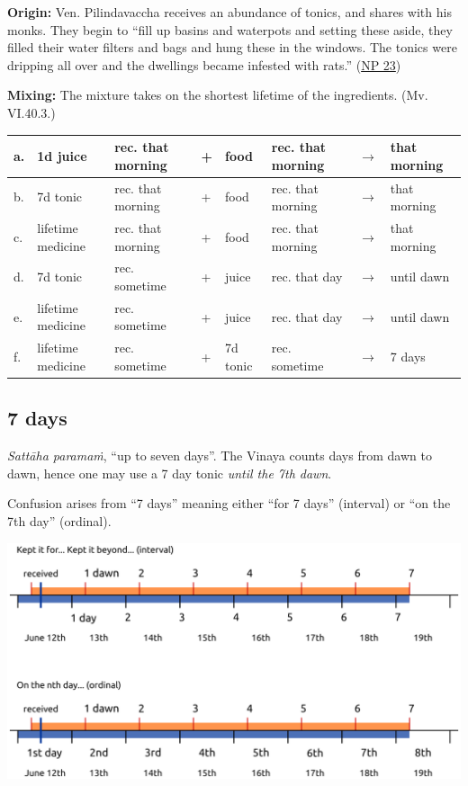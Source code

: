\clearpage

\textbf{Origin:} Ven. Pilindavaccha receives an abundance of tonics, and
shares with his monks. They begin to ``fill up basins and waterpots and
setting these aside, they filled their water filters and bags and hung
these in the windows. The tonics were dripping all over and the
dwellings became infested with rats.''
(\href{https://suttacentral.net/pli-tv-bu-vb-np23/en/brahmali}{NP 23})

\textbf{Mixing:} The mixture takes on the shortest lifetime of the
ingredients. (Mv. VI.40.3.)

\begin{center}
\begin{tabular}{llllllll}
a. & 1d juice & rec. that morning & + & food & rec. that morning & \(\rightarrow\) & that morning\\
\hline
b. & 7d tonic & rec. that morning & + & food & rec. that morning & \(\rightarrow\) & that morning\\
\hline
c. & lifetime medicine & rec. that morning & + & food & rec. that morning & \(\rightarrow\) & that morning\\
\hline
d. & 7d tonic & rec. sometime & + & juice & rec. that day & \(\rightarrow\) & until dawn\\
\hline
e. & lifetime medicine & rec. sometime & + & juice & rec. that day & \(\rightarrow\) & until dawn\\
\hline
f. & lifetime medicine & rec. sometime & + & 7d tonic & rec. sometime & \(\rightarrow\) & 7 days\\
\end{tabular}
\end{center}

\subsection{7 days}

\emph{Sattāha paramaṁ}, ``up to seven days''. The Vinaya counts days
from dawn to dawn, hence one may use a 7 day tonic \emph{until the 7th
dawn}.

Confusion arises from ``7 days'' meaning either ``for 7 days''
(interval) or ``on the 7th day'' (ordinal).

\vspace*{\baselineskip}
\includegraphics[width=\linewidth]{../../src/includes/figures/7-days.png}

